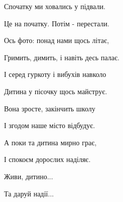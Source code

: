 Спочатку ми ховались у підвали.

Це на початку. Потім - перестали.

Ось фото: понад нами щось літає,

Гримить, димить, і навіть десь палає.

І серед гуркоту і вибухів навколо

Дитина у пісочку щось майструє.

Вона зросте, закінчить школу

І згодом наше місто відбудує.

А поки та дитина мирно грає,

І спокоєм дорослих наділяє.

Живи, дитино...

Та даруй надії...

